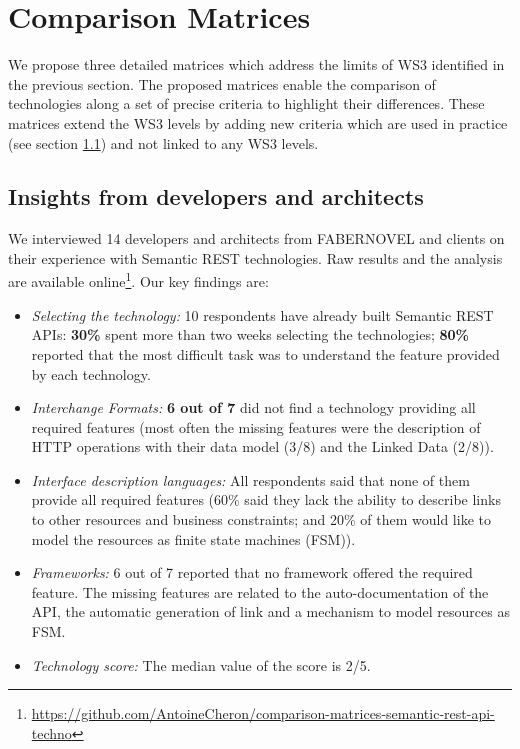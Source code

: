 \vspace*{-0.2cm}

\section{Comparison Matrices}\label{sec:matrix}

\vspace*{-0.2cm}

We propose three detailed matrices which address the limits of WS3 identified in the previous section. 
The proposed matrices enable the comparison of technologies along a set of precise criteria to highlight their differences. 
These matrices extend the WS3 levels by adding new criteria which are used in practice (see section \ref{sec:insight}) and not linked to any WS3 levels.

\vspace*{-0.1cm}
\subsection{Insights from developers and architects}\label{sec:insight}

We interviewed 14 developers and architects from FABERNOVEL and clients on their experience with Semantic REST technologies. Raw results and the analysis are available online\footnote{\url{https://github.com/AntoineCheron/comparison-matrices-semantic-rest-api-techno}}. Our key findings are:
\begin{itemize}
 \item \textit{Selecting the technology:} 10 respondents have already built Semantic REST APIs: \textbf{30\%} spent more than two weeks selecting the technologies; \textbf{80\%} reported that the most difficult task was to understand the feature provided by each technology.
 \item \textit{Interchange Formats:} \textbf{6 out of 7} did not find a technology providing all required features (most often the missing features were the description of HTTP operations with their data model (3/8) and the Linked Data (2/8)). 
 \item \textit{Interface description languages:} All respondents said that none of them provide all required features (60\% said they lack the ability to describe links to other resources and business constraints; and 20\% of them would like to model the resources as finite state machines (FSM)).
 \item \textit{Frameworks:} 6 out of 7 reported that no framework offered the required feature. The missing features are related to the auto-documentation of the API, the automatic generation of link and a mechanism to model resources as FSM.
 \item \textit{Technology score:} The median value of the score is 2/5.
\end{itemize}

